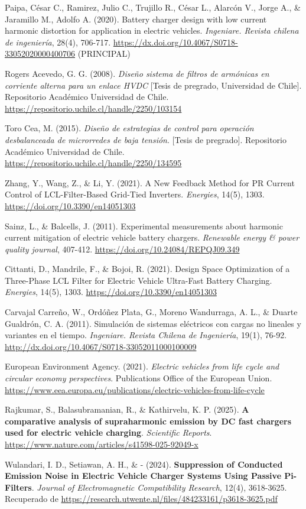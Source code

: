 \begin{thebibliography}{9}
	Paipa, César C., Ramirez, Julio C., Trujillo R., César L., Alarcón V., Jorge A., \& Jaramillo M., Adolfo A. (2020). Battery charger design with low current harmonic distortion for application in electric vehicles. \textit{Ingeniare. Revista chilena de ingeniería}, 28(4), 706-717. \url{https://dx.doi.org/10.4067/S0718-33052020000400706} (PRINCIPAL)

	Rogers Acevedo, G. G. (2008). \textit{Diseño sistema de filtros de armónicas en corriente alterna para un enlace HVDC} [Tesis de pregrado, Universidad de Chile]. Repositorio Académico Universidad de Chile. \url{https://repositorio.uchile.cl/handle/2250/103154}

	Toro Cea, M. (2015). \textit{Diseño de estrategias de control para operación desbalanceada de microrredes de baja tensión}. [Tesis de pregrado]. Repositorio Académico Universidad de Chile. \url{https://repositorio.uchile.cl/handle/2250/134595}

	Zhang, Y., Wang, Z., \& Li, Y. (2021). A New Feedback Method for PR Current Control of LCL-Filter-Based Grid-Tied Inverters. \textit{Energies}, 14(5), 1303. \url{https://doi.org/10.3390/en14051303}

	Sainz, L., \& Balcells, J. (2011). Experimental measurements about harmonic current mitigation of electric vehicle battery chargers. \textit{Renewable energy \& power quality journal}, 407-412. \url{https://doi.org/10.24084/REPQJ09.349}

	Cittanti, D., Mandrile, F., \& Bojoi, R. (2021). Design Space Optimization of a Three-Phase LCL Filter for Electric Vehicle Ultra-Fast Battery Charging. \textit{Energies}, 14(5), 1303. \url{https://doi.org/10.3390/en14051303}

	Carvajal Carreño, W., Ordóñez Plata, G., Moreno Wandurraga, A. L., \& Duarte Gualdrón, C. A. (2011). Simulación de sistemas eléctricos con cargas no lineales y variantes en el tiempo. \textit{Ingeniare. Revista Chilena de Ingeniería}, 19(1), 76-92. \url{http://dx.doi.org/10.4067/S0718-33052011000100009}

	European Environment Agency. (2021). \textit{Electric vehicles from life cycle and circular economy perspectives}. Publications Office of the European Union. \url{https://www.eea.europa.eu/publications/electric-vehicles-from-life-cycle}

	Rajkumar, S., Balasubramanian, R., \& Kathirvelu, K. P. (2025). \textbf{A comparative analysis of supraharmonic emission by DC fast chargers used for electric vehicle charging}. \textit{Scientific Reports}. \url{https://www.nature.com/articles/s41598-025-92049-x}

	Wulandari, I. D., Setiawan, A. H., \& - (2024). \textbf{Suppression of Conducted Emission Noise in Electric Vehicle Charger Systems Using Passive Pi-Filters}. \textit{Journal of Electromagnetic Compatibility Research}, 12(4), 3618-3625. Recuperado de \url{https://research.utwente.nl/files/484233161/p3618-3625.pdf}
\end{thebibliography}
